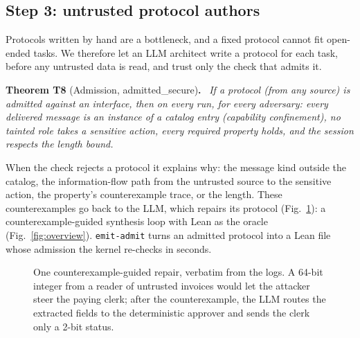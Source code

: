 \documentclass[10pt,twocolumn]{article}
\newenvironment{theorem}[2]{\par\smallskip\noindent\textbf{Theorem #1} (#2)\textbf{.}\ \itshape}{\par\smallskip}
\newcommand{\code}[1]{\texttt{\small #1}}
\newcommand{\thm}[1]{\textcolor{dk}{\textsf{\small #1}}}
\begin{document}
\subsection{Step 3: untrusted protocol authors}

Protocols written by hand are a bottleneck, and a fixed protocol cannot fit open-ended tasks. We therefore let an
LLM architect write a protocol for each task, before any untrusted data is read, and trust only the check that
admits it.

\begin{theorem}{T8}{Admission, \thm{admitted\_secure}}
If a protocol (from any source) is admitted against an interface, then on every run, for every adversary:
every delivered message is an instance of a catalog entry (\emph{capability confinement}), no tainted role takes
a sensitive action, every required property holds, and the session respects the length bound.
\end{theorem}

\noindent When the check rejects a protocol it explains why: the message kind outside the catalog, the
information-flow path from the untrusted source to the sensitive action, the property's counterexample trace, or
the length. These counterexamples go back to the LLM, which repairs its protocol (Fig.~\ref{fig:repair}): a
counterexample-guided synthesis loop with Lean as the oracle (Fig.~\ref{fig:overview}). \code{emit-admit} turns an admitted protocol into a Lean file whose
admission the kernel re-checks in seconds.

\begin{figure}[t]\footnotesize
\setlength{\fboxsep}{3pt}\vspace{-1ex}
\caption{One counterexample-guided repair, verbatim from the logs. A 64-bit integer from a reader of untrusted
invoices would let the attacker steer the paying clerk; after the counterexample, the LLM routes the extracted
fields to the deterministic approver and sends the clerk only a 2-bit status.}
\label{fig:repair}\vspace{-2ex}
\end{figure}
\end{document}
